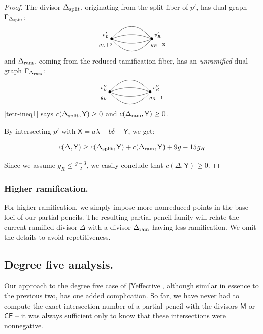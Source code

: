 \documentclass[reqno, 10 pt]{article}
\theoremstyle{definition}
\theoremstyle{remark}
\numberwithin{equation}{section}
\numberwithin{thm}{section}
\numberwithin{prop}{section}
\numberwithin{lem}{section}
\numberwithin{cor}{section}
\numberwithin{conj}{section}
\numberwithin{defn}{section}
\newcommand{\sfY}{{\mathsf Y}}
\newcommand{\sfX}{{\mathsf X}}
\newcommand{\sfCE}{{\mathsf {CE}}}
\newcommand{\sfM}{{\mathsf M}}
\newcommand {\spl}{{\rm split}}
\newcommand {\ram}{{\rm ram}}
\begin{document}
\begin{proof}
The divisor $\Delta_{\spl}$, originating from the split fiber of $p'$, has dual graph $\Gamma_{\Delta_{\spl}}$: \[  \xygraph{
!{<0cm,0cm>;<1cm,0cm>:<0cm,1cm>::}
!{(0,0) }*{\bullet}="l"!{(-.3,.2)}{\scriptstyle v'_L}!{(-.3,-.3)}{\scriptstyle g_L+2}
!{(2,0) }*{\bullet}="r"!{(2.3,.2)}{\scriptstyle v'_R}!{(2.3,-.3)}{\scriptstyle g_R-3}
 "l"-@/^.6cm/"r"  
"l"-@/^/"r" 
"l"-@/_/"r"
"l"-@/_.6cm/"r" 
}  \]and $\Delta_{\ram}$, coming from the reduced tamification fiber, has an {\sl unramified} dual graph $\Gamma_{\Delta_{\ram}}$: \[  \xygraph{
!{<0cm,0cm>;<1cm,0cm>:<0cm,1cm>::}
!{(0,0) }*{\bullet}="l"!{(-.3,.2)}{\scriptstyle v''_L}!{(-.3,-.3)}{\scriptstyle g_L}
!{(2,0) }*{\bullet}="r"!{(2.3,.2)}{\scriptstyle v''_R}!{(2.3,-.3)}{\scriptstyle g_R-1}
 "l"-@/^.6cm/"r"  
"l"-@/^/"r" 
"l"-@/_/"r"
"l"-@/_.6cm/"r" 
}  \]  
\autoref{tetr-ineq1} says $c(\Delta_{\spl}, {\sfY}) \geq 0$ and $c(\Delta_{\ram}, {\sfY}) \geq 0$.

By intersecting $p'$ with $\sfX = a\lambda - b\delta - \sfY$, we get: 


\begin{equation}
c(\Delta, \sfY) \geq c(\Delta_{\spl}, {\sfY}) + c(\Delta_{\ram}, {\sfY}) + 9g -15g_R
\end{equation}


Since we assume $g_R \leq \frac{g-3}{2}$, we easily conclude  that $c(\Delta, \sfY) \geq 0$.  
\end{proof}

\subsubsection{Higher ramification.}
For higher ramification, we simply impose more nonreduced points in the base loci of our partial pencils.  The resulting partial pencil family will relate the current ramified divisor $\Delta$ with a divisor $\Delta_{\ram}$ having less ramification.  We omit the details to avoid repetitiveness.

\subsection{Degree five analysis.} 

Our approach to the degree five case of \autoref{Yeffective}, although similar in essence to the previous two, has one added complication.  So far, we have never had to compute the exact intersection number of a partial pencil with the divisors $\sfM$ or $\sfCE$ -- it was always sufficient only to know that these intersections were nonnegative.
\end{document}
